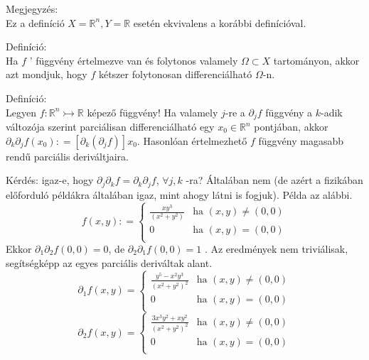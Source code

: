 \documentclass[12pt,a4paper]{scrartcl}
\newenvironment{definicio}{}{}
\newenvironment{megjegyzes}{}{}
\begin{document}
\begin{megjegyzes}

Megjegyzés:\\
Ez a definíció \(X = {\mathbb{R}}^{n},Y = {\mathbb{R}}\) esetén
ekvivalens a korábbi definícióval.

\end{megjegyzes}

\begin{definicio}

Definíció:\\
Ha \(f\) ' függvény értelmezve van és folytonos valamely
\(\Omega \subset X\) tartományon, akkor azt mondjuk, hogy \(f\) kétszer
folytonosan differenciálható \(\Omega\)-n.

\end{definicio}

\begin{definicio}

Definíció:\\
Legyen \(\left. f:{\mathbb{R}}^{n}\rightarrowtail{\mathbb{R}} \right.\)
képező függvény! Ha valamely \(j\)-re a \(\partial_{j}f\) függvény a
\(k\)-adik változója szerint parciálisan differenciálható egy
\(x_{0} \in {\mathbb{R}}^{n}\) pontjában, akkor
\(\partial_{k}\partial_{j}f\left( x_{0} \right): = \left\lbrack {\partial_{k}\left( {\partial_{j}f} \right)} \right\rbrack x_{0}\).
Hasonlóan értelmezhető \(f\) függvény magasabb rendű parciális
deriváltjaira.

\end{definicio}

Kérdés: igaz-e, hogy
\(\partial_{j}\partial_{k}f = \partial_{k}\partial_{j}f\),
\(\forall j,k\) -ra? Általában nem (de azért a fizikában előforduló
példákra általában igaz, mint ahogy látni is fogjuk). Példa az alábbi.
\[f\left( {x,y} \right): = \begin{cases}
\frac{xy^{3}}{\left( {x^{2} + y^{2}} \right)} & {\text{ha~}\left( {x,y} \right) \neq \left( 0,0 \right)} \\
0 & {\text{ha~}\left( {x,y} \right) = \left( 0,0 \right)} \\
\end{cases}\] Ekkor \(\partial_{1}\partial_{2}f\left( 0,0 \right) = 0\),
de \(\partial_{2}\partial_{1}f\left( 0,0 \right) = 1\) . Az eredmények
nem triviálisak, segítségképp az egyes parciális deriváltak alant.
\[\partial_{1}f\left( {x,y} \right) = \begin{cases}
\frac{y^{5} - x^{2}y^{3}}{\left( {x^{2} + y^{2}} \right)^{2}} & {\text{ha~}\left( {x,y} \right) \neq \left( 0,0 \right)} \\
0 & {\text{ha~}\left( {x,y} \right) = \left( 0,0 \right)} \\
\end{cases}\] \[\partial_{2}f\left( {x,y} \right) = \begin{cases}
\frac{3x^{3}y^{2} + xy^{2}}{\left( {x^{2} + y^{2}} \right)^{2}} & {\text{ha~}\left( {x,y} \right) \neq \left( 0,0 \right)} \\
0 & {\text{ha~}\left( {x,y} \right) = \left( 0,0 \right)} \\
\end{cases}\]
\end{document}
